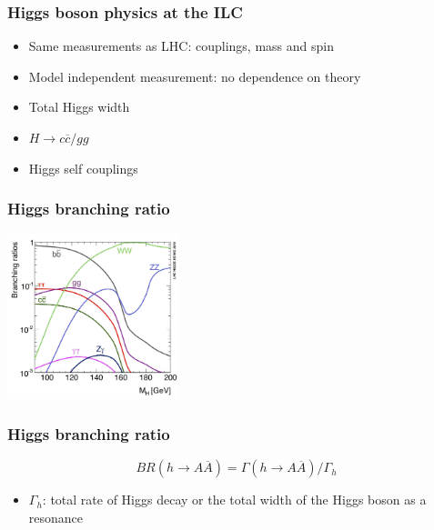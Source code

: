\documentclass{beamer}
\begin{document}
  
  \begin{frame}[plain]
    \frametitle{Higgs boson physics at the ILC}

    \begin{itemize}
      \item Same measurements as LHC: couplings, mass and spin
      \item Model independent measurement: no dependence on theory
      \item Total Higgs width
      \item $H \rightarrow c\overline{c}/gg$
      \item Higgs self couplings
    \end{itemize}
  \end{frame}

  
  \begin{frame}[plain]
    \frametitle{Higgs branching ratio}

    \begin{center}
      \includegraphics[width = 5cm]{Pictures/higgsbr.jpg}
    \end{center}
  \end{frame}

  
  \begin{frame}[plain]
    \frametitle{Higgs branching ratio}

    \[ BR(h \rightarrow A\overline{A}) = \Gamma(h \rightarrow A\overline{A})/\Gamma_h\]

    \begin{itemize}
      \item $\Gamma_h$: total rate of Higgs decay or the total width of the Higgs boson as a resonance
    \end{itemize}
  \end{frame}
\end{document}

